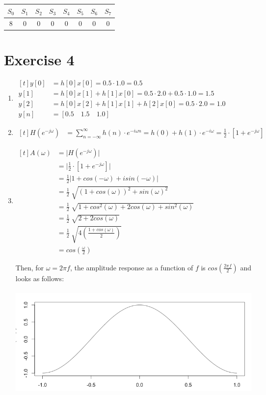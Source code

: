 \documentclass[12pt]{article}
\begin{document}
\begin{tabular}{*{8}{|c}|}
\hline
$S_0$ & $S_1$ & $S_2$ & $S_3$ & $S_4$ & $S_5$ & $S_6$ & $S_7$ \\
 & 0 & 0 & 0 & 0 & 0 & 0 & 0\\
\hline
\end{tabular}


\section*{Exercise 4}
\begin{enumerate}[label=\alph*)]
\item 
$\begin{aligned}[t]
y[0] &= h[0]x[0] = 0.5 \cdot 1.0 = 0.5 \\
y[1] &= h[0]x[1] + h[1]x[0] = 0.5 \cdot 2.0 + 0.5\cdot 1.0 = 1.5 \\
y[2] &= h[0]x[2] + h[1]x[1] + h[2]x[0] = 0.5\cdot2.0 = 1.0 \\
y[n] &= [0.5\quad1.5\quad1.0]
\end{aligned}$

\item
$\begin{aligned}[t]
H(e^{-j\omega}) &= \sum_{n=-\infty}^{\infty} h(n) \cdot e^{-i \omega n} = h(0) + h(1) \cdot e^{-i\omega} = \frac{1}{2}\cdot[1 + e^{-j\omega}]
\end{aligned}$

\item 
$\begin{aligned}[t]
A(\omega) &= \lvert H(e^{-j\omega}) \rvert \\
&= \lvert \frac{1}{2}\cdot[1 + e^{-j\omega}] \rvert \\
&= \frac{1}{2} \lvert 1 + cos(-\omega) + i sin(-\omega) \rvert \\
&= \frac{1}{2} \sqrt[]{(1 + cos(\omega))^2 + sin(\omega)^2} \\
&= \frac{1}{2} \sqrt[]{1 + cos^2(\omega) + 2cos(\omega) + sin^2(\omega)} \\
&= \frac{1}{2} \sqrt[]{2 + 2cos(\omega)} \\
&= \frac{1}{2} \sqrt[]{4(\frac{1 + cos(\omega)}{2})} \\
&= cos(\frac{\omega}{2})
\end{aligned}$

Then, for $\omega = 2\pi f$, the amplitude response as a function of $f$ is $cos(\frac{2\pi f}{2})$ and looks as follows:\\\\
\includegraphics[scale=0.55]{hw2-img.png}

\end{enumerate}
\end{document}
